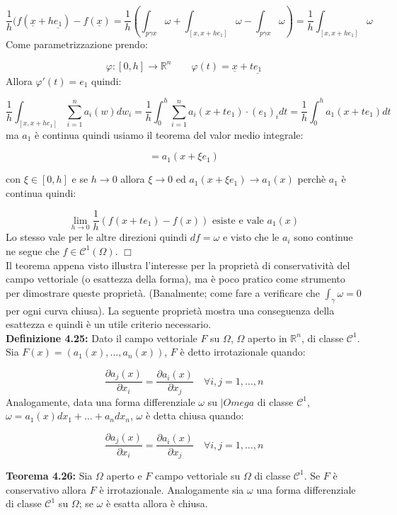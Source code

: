 \documentclass[a4paper,11pt,titlepage]{book}
\begin{document}
$$\frac{1}{h}(f(\underline{x}+h\underline{e_1})-f(\underline{x})=\frac{1}{h}\left(\int_{p\gamma x}\omega+\int_{[x,x+he_1]}\omega-\int_{p\gamma x}\omega\right)=\frac{1}{h}\int_{[x,x+he_1]}\omega$$
Come parametrizzazione prendo:

$$\varphi:[0,h]\to\mathbb{R}^n\qquad\varphi(t)=\underline{x}+t\underline{e_1}$$
Allora $\varphi'(t)=e_1$ quindi:

$$\frac{1}{h}\int_{[x,x+he_1]}\sum_{i=1}^n a_i(w)dw_i=\frac{1}{h}\int_0^h\sum_{i=1}^n a_i(x+te_1)\cdot(e_1)_idt=\frac{1}{h}\int_0^ha_1(x+te_1)dt$$
ma $a_1$ è continua quindi usiamo il teorema del valor medio integrale:

$$=a_1(x+\xi e_1)$$

con $\xi\in[0,h]$ e se $h\to 0$ allora $\xi\to 0$ ed $a_1(x+\xi e_1)\to a_1(x)$ perchè $a_1$ è continua quindi:

$$\lim_{h\to 0} \frac{1}{h}(f(x+te_1)-f(x))\mbox{ esiste e vale }a_1(x)$$
Lo stesso vale per le altre direzioni quindi $df=\omega$ e visto che le $a_i$ sono continue ne segue che $f\in\mathcal{C}^1(\Omega)$. $\Box$\\

Il teorema appena visto illustra l'interesse per la proprietà di conservatività del campo vettoriale (o esattezza della forma), ma è poco pratico come strumento per dimostrare queste proprietà. (Banalmente; come fare a verificare che $\int_\gamma\omega=0$ per ogni curva chiusa). La seguente proprietà mostra una conseguenza della esattezza e quindi è un utile criterio necessario.\\

\textbf{Definizione 4.25: }Dato il campo vettoriale $F$ su $\Omega$, $\Omega$ aperto in $\mathbb{R}^n$, di classe $\mathcal{C}^1$. Sia $F(x)=(a_1(x),\ldots,a_n(x))$, $F$ è detto irrotazionale quando:

$$\frac{\partial a_j(x)}{\partial x_i}=\frac{\partial a_i(x)}{\partial x_j}\quad\forall i,j=1,\ldots,n$$
Analogamente, data una forma differenziale $\omega$ su $|Omega$ di classe $\mathcal{C}^1$, $\omega=a_1(x)dx_1+\ldots+a_ndx_n$, $\omega$ è detta chiusa quando:

$$\frac{\partial a_j(x)}{\partial x_i}=\frac{\partial a_i(x)}{\partial x_j}\quad\forall i,j=1,\ldots,n$$

\textbf{Teorema 4.26: }Sia $\Omega$ aperto e $F$ campo vettoriale su $\Omega$ di classe $\mathcal{C}^1$. Se $F$ è conservativo allora $F$ è irrotazionale. Analogamente sia $\omega$ una forma differenziale di classe $\mathcal{C}^1$ su $\Omega$; se $\omega$ è esatta allora è chiusa.\\
\end{document}
